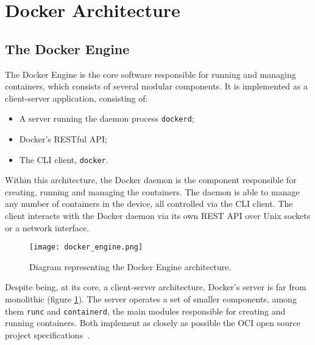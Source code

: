 \section{Docker Architecture}
\label{sec::arch}



\subsection{The Docker Engine}
\label{sec::arch:engine}
The Docker Engine is the core software responsible for running and managing containers, which consists of several modular components\cite{Docker-engine}. It is implemented as a client-server application, consisting of:

\begin{itemize}
    \item A server running the daemon process \texttt{dockerd};
    \item Docker's \acs{REST}ful \acs{API};
    \item The \acs{CLI} client, \texttt{docker}.
\end{itemize}

Within this architecture, the Docker daemon is the component responsible for creating, running and managing the containers. The daemon is able to manage any number of containers in the device, all controlled via the \acs{CLI} client. The client interacts with the Docker daemon via its own \acs{REST} \acs{API} over Unix sockets or a network interface\cite{Poulton2020-ju}.

\begin{figure}[!htb]
    \centering
    \texttt{[image: docker\_engine.png]}
    \caption{Diagram representing the Docker Engine architecture\cite{fig-src:docker-engine}.}
    \label{fig::docker-engine-server}
\end{figure}

Despite being, at its core, a client-server architecture, Docker's server is far from monolithic (figure \ref{fig::docker-engine-server}). The server operates a set of smaller components, among them \texttt{runc} and \texttt{containerd}, the main modules responsible for creating and running containers. Both implement as closely as possible the OCI open source project specifications~\cite{Poulton2020-ju, oci-runc, git-runc, docker-containerd}.

